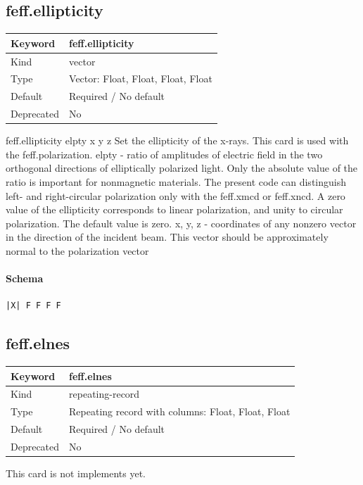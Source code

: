 \documentclass[11pt]{article}
\begin{document}
{{{\subsection{feff.ellipticity}
\label{kw:feff-ellipticity}
\begin{longtable}{|p{1.5in}|p{4.5in}|}
\hline
Keyword & feff.ellipticity \\
\hline
Kind & vector \\
\hline
Type & Vector: Float, Float, Float, Float \\
\hline
Default & Required / No default \\
\hline
Deprecated & No \\
\hline
\end{longtable}
 feff.ellipticity{ elpty x y z }
 Set the ellipticity of the x-rays.
 This card is used with the feff.polarization.
   elpty   - ratio of amplitudes of electric field in the two orthogonal
             directions of elliptically polarized light. Only the absolute
             value of the ratio is important for nonmagnetic materials. The
             present code can distinguish left- and right-circular polarization
             only with the feff.xmcd or feff.xncd. A zero value of the
             ellipticity corresponds to linear polarization, and unity to
             circular polarization. The default value is zero.
   x, y, z - coordinates of any nonzero vector in the direction of the
             incident beam. This vector should be approximately normal to the
             polarization vector

\paragraph{Schema}
\begin{Verbatim}
|X| F F F F
\end{Verbatim}

\subsection{feff.elnes}
\label{kw:feff-elnes}
\begin{longtable}{|p{1.5in}|p{4.5in}|}
\hline
Keyword & feff.elnes \\
\hline
Kind & repeating-record \\
\hline
Type & Repeating record with columns: Float, Float, Float \\
\hline
Default & Required / No default \\
\hline
Deprecated & No \\
\hline
\end{longtable}
 This card is not implements yet.

}}}
\end{document}
